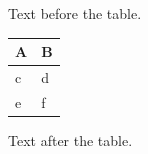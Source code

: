 \documentclass[12pt]{article}
\begin{document}
Text before the table.

\begin{tabular}{ll}\toprule A & B\\\midrule\addlinespace c & d\\\addlinespace[6pt] e & f\\\bottomrule\end{tabular}

Text after the table.
\end{document}
